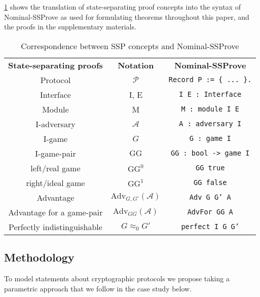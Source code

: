 \documentclass[a4paper,USenglish,cleveref, autoref]{lipics-v2021}
\newcommand{\Adv}{\mathrm{Adv}}
\newcommand{\A}{\mathcal{A}}
\begin{document}
\cref{tab:translation} shows the translation of state-separating proof concepts into the syntax of Nominal-SSProve as used for formulating theorems throughout this paper, and the proofs in the supplementary materials.



\begin{table}
  \begin{center}
  \begin{tabular}{c|c|c}
    \textbf{State-separating proofs} & \textbf{Notation} & \textbf{Nominal-SSProve} \\
    Protocol & $\mathcal{P}$ & \texttt{Record P := \{ ... \}.} \\
    Interface & I, E & \texttt{I E : Interface} \\
    Module & M & \texttt{M : module I E} \\
    I-adversary & $\A$ & \texttt{A : adversary I} \\
    I-game & $G$ & \texttt{G : game I} \\
    I-game-pair & $\mathrm{GG}$ & \texttt{GG : bool -> game I} \\
    left/real game & $\mathrm{GG^0}$ & \texttt{GG true} \\
    right/ideal game & $\mathrm{GG^1}$ & \texttt{GG false} \\
    Advantage & $\Adv_{G, G'}(\A)$ & \texttt{Adv G G' A} \\
    Advantage for a game-pair & $\Adv_{GG}(\A)$ & \texttt{AdvFor GG A} \\
    Perfectly indistinguishable & $G \approx_0 G'$ & \texttt{perfect I G G'} \\
  \end{tabular}
  \end{center}
  \caption{Correspondence between SSP concepts and Nominal-SSProve}
  \label{tab:translation}
\end{table}

\subsection{Methodology}\label{sec:method}

To model statements about cryptographic protocols we propose taking a
parametric approach that we follow in the case study below.
\end{document}
